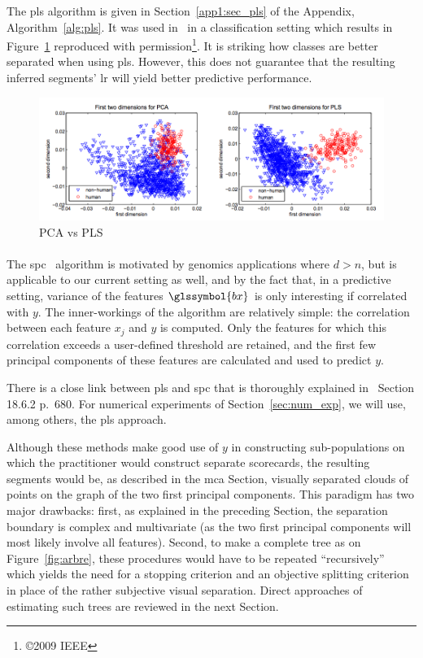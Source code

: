 The \gls{pls} algorithm is given in Section~\ref{app1:sec_pls} of the Appendix, Algorithm~\ref{alg:pls}. It was used in~\cite{schwartz2009human} in a classification setting which results in Figure~\ref{fig:pca_vs_pls} reproduced with permission\footnote{\copyright 2009 IEEE}. It is striking how classes are better separated when using \gls{pls}. However, this does not guarantee that the resulting inferred segments' \gls{lr} will yield better predictive performance.

\begin{figure}
\includegraphics[width = \textwidth]{figures/chapitre6/pca_vs_pls.png}
\caption{PCA vs PLS}
\label{fig:pca_vs_pls}
\end{figure}

\paragraph{}

The \gls{spc}~\cite{bair2006prediction} algorithm is motivated by genomics applications where $d > n$, but is applicable to our current setting as well, and by the fact that, in a predictive setting, variance of the features $\glssymbol{bx}$ is only interesting if correlated with $y$. The inner-workings of the algorithm are relatively simple: the correlation between each feature $x_j$ and $y$ is computed. Only the features for which this correlation exceeds a user-defined threshold are retained, and the first few principal components of these features are calculated and used to predict $y$.

There is a close link between \gls{pls} and \gls{spc} that is thoroughly explained in~\cite{friedman2001elements} Section 18.6.2 p.\ 680. For numerical experiments of Section~\ref{sec:num_exp}, we will use, among others, the \gls{pls} approach.

\medskip

Although these methods make good use of $y$ in constructing sub-populations on which the practitioner would construct separate scorecards, the resulting segments would be, as described in the \gls{mca} Section, visually separated clouds of points on the graph of the two first principal components. This paradigm has two major drawbacks: first, as explained in the preceding Section, the separation boundary is complex and multivariate (as the two first principal components will most likely involve all features). Second, to make a complete tree as on Figure~\ref{fig:arbre}, these procedures would have to be repeated ``recursively'' which yields the need for a stopping criterion and an objective splitting criterion in place of the rather subjective visual separation. Direct approaches of estimating such trees are reviewed in the next Section.

